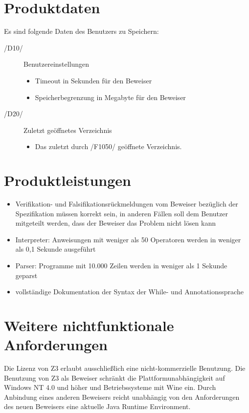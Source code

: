\documentclass[a4paper,10pt]{article}
\begin{document}
\section{Produktdaten}
Es sind folgende Daten des Benutzers zu Speichern:\\
\begin{description}
\item[/D10/] Benutzereinstellungen
\begin{itemize}
  \item Timeout in Sekunden f\"{u}r den Beweiser
  \item Speicherbegrenzung in Megabyte f\"{u}r den Beweiser
\end{itemize}
\item[/D20/] Zuletzt ge\"{o}ffnetes Verzeichnis
\begin{itemize}
  \item Das zuletzt durch /F1050/ ge\"{o}ffnete Verzeichnis.
\end{itemize}
\end{description}


\section{Produktleistungen}
\begin{itemize}
  \item Verifikation- und Falsifikationsr\"{u}ckmeldungen vom Beweiser bez\"{u}glich der Spezifikation m\"{u}ssen korrekt sein, in anderen F\"{a}llen soll dem Benutzer mitgeteilt werden, dass der Beweiser das Problem nicht l\"{o}sen kann
  \item Interpreter: Anweisungen mit weniger als 50 Operatoren werden in weniger als 0,1 Sekunde ausgef\"{u}hrt
  \item Parser: Programme mit 10.000 Zeilen werden in weniger als 1 Sekunde geparst
  \item vollst\"{a}ndige Dokumentation der Syntax der While- und Annotationssprache
\end{itemize}

\section{Weitere nichtfunktionale Anforderungen}
Die Lizenz von Z3 erlaubt ausschlie\ss{}lich eine nicht-kommerzielle Benutzung.
Die Benutzung von Z3 als Beweiser schr\"{a}nkt die Plattformunabh\"{a}ngigkeit auf Windows NT 4.0 und h\"{o}her und Betriebssysteme mit Wine ein. Durch Anbindung eines anderen Beweisers reicht unabh\"{a}ngig von den Anforderungen des neuen Beweisers eine aktuelle Java Runtime Environment.
\end{document}
